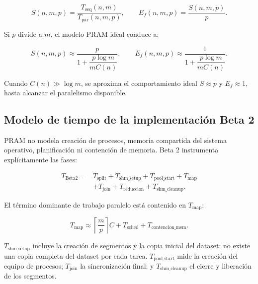 \documentclass[11pt,a4paper]{article}
\newcommand{\Speedup}{S}
\newcommand{\Efficiency}{E_f}
\newcommand{\Cost}{C}
\begin{document}
\begin{equation}
    \Speedup(n,m,p)
    =
    \frac{T_{\mathrm{seq}}(n,m)}
         {T_{\mathrm{par}}(n,m,p)},
    \qquad
    \Efficiency(n,m,p)
    =
    \frac{\Speedup(n,m,p)}{p}.
    \label{eq:speedup-nmp}
\end{equation}

Si $p$ divide a $m$, el modelo PRAM ideal conduce a:

\begin{equation}
    \Speedup(n,m,p)
    \approx
    \frac{p}
    {1+\dfrac{p\log m}{m\Cost(n)}},
    \qquad
    \Efficiency(n,m,p)
    \approx
    \frac{1}
    {1+\dfrac{p\log m}{m\Cost(n)}}.
    \label{eq:speedup-div}
\end{equation}

Cuando $\Cost(n)\gg\log m$, se aproxima el comportamiento ideal
$\Speedup\approx p$ y $\Efficiency\approx1$, hasta alcanzar el paralelismo disponible.

\subsection{Modelo de tiempo de la implementación Beta 2}

PRAM no modela creación de procesos, memoria compartida del sistema operativo,
planificación ni contención de memoria. Beta 2 instrumenta explícitamente las fases:

\begin{equation}
\begin{split}
    T_{\mathrm{Beta2}}
    ={}&
    T_{\mathrm{split}}
    +T_{\mathrm{shm\_setup}}
    +T_{\mathrm{pool\_start}}
    +T_{\mathrm{map}} \\
    &+
    T_{\mathrm{join}}
    +T_{\mathrm{reduccion}}
    +T_{\mathrm{shm\_cleanup}}.
\end{split}
\label{eq:beta2-tiempo}
\end{equation}

El término dominante de trabajo paralelo está contenido en $T_{\mathrm{map}}$:

\begin{equation}
    T_{\mathrm{map}}
    \approx
    \left\lceil\frac{m}{p}\right\rceil\Cost
    +T_{\mathrm{sched}}
    +T_{\mathrm{contencion\_mem}}.
\end{equation}

$T_{\mathrm{shm\_setup}}$ incluye la creación de segmentos y la copia inicial del
dataset; no existe una copia completa del dataset por cada tarea. $T_{\mathrm{pool\_start}}$
mide la creación del equipo de procesos; $T_{\mathrm{join}}$ la sincronización final; y
$T_{\mathrm{shm\_cleanup}}$ el cierre y liberación de los segmentos.
\end{document}
